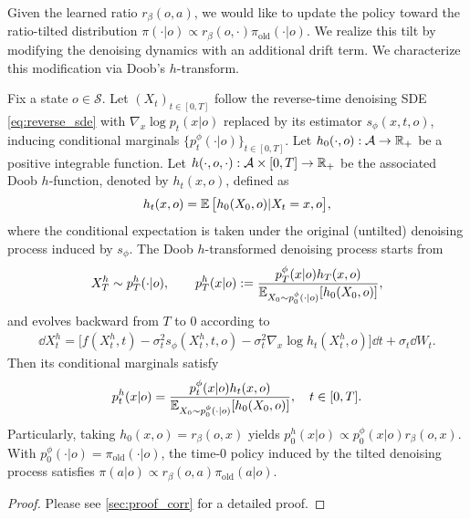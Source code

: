 Given the learned ratio $r_\beta(o,a)$, we would like to update the policy toward the ratio-tilted distribution
$\pi(\cdot|o)\propto r_\beta(o,\cdot)\pi_{\mathrm{old}}(\cdot|o)$.
We realize this tilt by modifying the denoising dynamics with an additional drift term.
We characterize this modification via Doob's $h$-transform.

\begin{lemma}
\label{lem:algo_correctness}
Fix a state $o \in\mathcal{S}$.
Let $(X_t)_{t\in[0,T]}$ follow the reverse-time denoising SDE \eqref{eq:reverse_sde} with $\nabla_x \log p_t(x|o)$ replaced by its estimator $s_\phi(x,t,o)$, inducing conditional marginals
$\{p_t^\phi(\cdot|o)\}_{t\in[0,T]}$.
Let $h_0(\cdot,o):\mathcal{A}\to\mathbb{R}_+$ be a positive integrable function.
Let $h(\cdot,o,\cdot):\mathcal{A}\times[0,T]\to \mathbb{R}_+$ be the associated Doob $h$-function, denoted by $h_t(x,o)$, defined as
\begin{align}
\label{eq:solution_exp}
    h_t(x,o)
    =
    \operatorname*{{\mathbb{E}}} \big[h_0(X_0,o)| X_t=x,o\big],
\end{align}
where the conditional expectation is taken under the original (untilted) denoising process induced by $s_\phi$.
The Doob $h$-transformed denoising process starts from
\[
    X_T^h \sim p_T^h(\cdot|o),
    \qquad
    p_T^h(x|o)
    :=
    \frac{
        p_T^\phi(x|o) h_T(x,o)
    }{
        \operatorname*{{\mathbb{E}}}_{X_0\sim p_0^{\phi}(\cdot|o)}[h_0(X_0,o)]
    },
\]
and evolves backward from $T$ to $0$ according to
\begin{align}
\label{eq:new_process}
    \dd X_t^{h}
    =
    \Big[
        f(X_t^{h},t)
        -\sigma_t^2 s_\phi(X_t^{h},t,o)
        -\sigma_t^2 \nabla_x \log h_t(X_t^{h},o)
    \Big]\dd t
    +\sigma_t\dd W_t.
\end{align}
Then its conditional marginals satisfy
\begin{align}
    p_t^{h}(x|o)
    =
    \frac{
        p_t^\phi(x|o)h_t(x,o)
    }{
        \operatorname*{{\mathbb{E}}}_{X_0\sim p_0^{\phi}(\cdot|o)}[h_0(X_0,o)]
    },
    \quad t\in[0,T].
    \label{eq:p_t^h}
\end{align}
Particularly, taking $h_0(x,o)=r_\beta(o,x)$ yields
$p_0^h(x|o)\propto p_0^{\phi}(x|o)r_\beta(o,x)$.
With $p_0^{\phi}(\cdot|o)=\pi_{\mathrm{old}}(\cdot|o)$, the time-$0$ policy induced by the tilted denoising process satisfies
$\pi(a|o)\propto r_\beta(o,a)\pi_{\mathrm{old}}(a|o)$.
\end{lemma}

\begin{proof}
Please see \cref{sec:proof_corr} for a detailed proof.
\end{proof}



